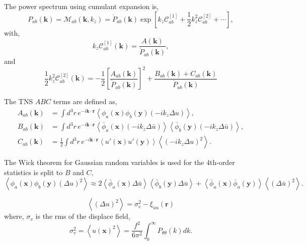 \documentclass[a4paper,11pt, fleqn]{article}
\begin{document}
The power spectrum using cumulant expansion is,
\begin{equation}
  P_{ab}(\bm{k}) = \mathcal{M}_{ab}(\bm{k}, k_z) = 
  \mathring{P}_{ab}(\bm{k}) \exp\left[
    k_z \mathscr{C}^{[1]}_{ab}
    + \frac{1}{2} k_z^2 \mathscr{C}^{[2]}_{ab} + \cdots
    \right],
\end{equation}
with,
\begin{equation}
  k_z \mathscr{C}^{[1]}_{ab}(\bm{k})
  = \frac{A(\bm{k})}{\mathring{P}_{ab}(\bm{k})},
\end{equation}
and
\begin{equation}
  \frac{1}{2} k^2_z \mathscr{C}^{[2]}_{ab}(\bm{k})
  = -\frac{1}{2} \left[\frac{A_{ab}(\bm{k})}{\mathring{P}_{ab}(\bm{k})}\right]^2
    + \frac{B_{ab}(\bm{k}) + C_{ab}(\bm{k})}{\mathring{P}_{ab}(\bm{k})}
\end{equation}


The TNS $ABC$ terms are defined as,
\begin{align}
  A_{ab}(\bm{k}) &=
    \int\!d^3 r \, e^{-i\bm{k}\cdot\bm{r}} \left\langle
    \phi_a(\bm{x}) \phi_b(\bm{y}) (-i k_z \Delta u) \right\rangle,\\
  B_{ab}(\bm{k}) &=
   \int\!d^3 r \, e^{-i\bm{k}\cdot\bm{r}}
    \left\langle \bar{\phi}_a(\bm{x})
                  (-ik_z \Delta \bar{u}) \right\rangle
    \left\langle \bar{\phi}_b(\bm{y})
                  (-ik_z \Delta \bar{u}) \right\rangle,\\
  C_{ab}(\bm{k}) &=
    \frac{1}{2} \int\!\! d^3 r \, e^{-i\bm{k}\cdot\bm{r}}
    \left\langle u'(\bm{x}) u'(\bm{y}) \right\rangle
    \left\langle (-ik_z \Delta u )^2 \right\rangle.
\end{align}

The Wick theorem for Gaussian random variables is used for the
4th-order statistics is split to $B$ and $C$,
\begin{equation}
  \left\langle
  \phi_a(\bm{x}) \phi_b(\bm{y}) (\Delta u)^2 \right\rangle
  \approx
  2 \left\langle \bar{\phi}_a(\bm{x})
                  \Delta \bar{u} \right\rangle
    \left\langle \bar{\phi}_b(\bm{y})
                  \Delta \bar{u} \right\rangle
  + \left\langle \bar{\phi}_a(\bm{x})
                 \bar{\phi}_a(\bm{y}) \right\rangle
  \left\langle (\Delta \bar{u})^2 \right\rangle.
\end{equation}

\begin{equation}
  \left\langle (\Delta u)^2 \right\rangle
  = \sigma_v^2 - \xi_{uu}(\bm{r})
\end{equation}
where,
$\sigma_v$ is the rms of the displace field,
%
\begin{equation}
  \sigma_v^2 = \left\langle u(\bm{x})^2 \right\rangle = 
  \frac{f^2}{6\pi^2} \int_0^\infty \!\! P_{\theta\theta}(k) dk.
\end{equation}
%
\end{document}
